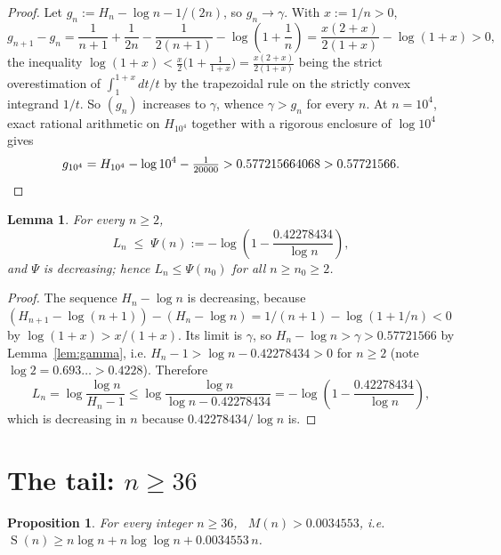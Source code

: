\documentclass[11pt]{amsart}
\newtheorem{lemma}[theorem]{Lemma}
\newtheorem{proposition}[theorem]{Proposition}
\DeclareMathOperator{\Sfun}{S}
\newcommand{\Hn}{H}
\begin{document}
\begin{proof}
Let $g_n:=\Hn_n-\log n-1/(2n)$, so $g_n\to\gamma$. With $x:=1/n>0$,
\[
 g_{n+1}-g_n=\frac1{n+1}+\frac1{2n}-\frac1{2(n+1)}-\log\!\left(1+\frac1n\right)
 =\frac{x(2+x)}{2(1+x)}-\log(1+x)>0,
\]
the inequality $\log(1+x)<\tfrac{x}{2}\bigl(1+\tfrac1{1+x}\bigr)=\tfrac{x(2+x)}{2(1+x)}$
being the strict overestimation of $\int_1^{1+x}dt/t$ by the trapezoidal rule on the
strictly convex integrand $1/t$. So $(g_n)$ increases to $\gamma$, whence $\gamma>g_n$
for every $n$. At $n=10^4$, exact rational arithmetic on $\Hn_{10^4}$ together with a
rigorous enclosure of $\log 10^4$ gives
\[
 g_{10^4}=\Hn_{10^4}-\log10^4-\tfrac1{20000}>0.577215664068>0.57721566 . \qedhere
\]
\end{proof}

\begin{lemma}\label{lem:V}
For every $n\ge2$,
\begin{equation}\label{eq:V}
 L_n\;\le\;\Psi(n):=-\log\!\left(1-\frac{0.42278434}{\log n}\right),
\end{equation}
and $\Psi$ is decreasing; hence $L_n\le\Psi(n_0)$ for all $n\ge n_0\ge2$.
\end{lemma}

\begin{proof}
The sequence $\Hn_n-\log n$ is decreasing, because
$(\Hn_{n+1}-\log(n+1))-(\Hn_n-\log n)=1/(n+1)-\log(1+1/n)<0$ by
$\log(1+x)>x/(1+x)$. Its limit is $\gamma$, so
$\Hn_n-\log n>\gamma>0.57721566$ by Lemma~\ref{lem:gamma}, i.e.
$\Hn_n-1>\log n-0.42278434>0$ for $n\ge2$ (note $\log2=0.693\ldots>0.4228$). Therefore
\[
 L_n=\log\frac{\log n}{\Hn_n-1}
 \le\log\frac{\log n}{\log n-0.42278434}
 =-\log\!\left(1-\frac{0.42278434}{\log n}\right),
\]
which is decreasing in $n$ because $0.42278434/\log n$ is.
\end{proof}

\section{The tail: $n\ge36$}

\begin{proposition}\label{prop:tail}
For every integer $n\ge36$, \ $M(n)>0.0034553$, i.e.
$\Sfun(n)\ge n\log n+n\log\log n+0.0034553\,n$.
\end{proposition}
\end{document}
